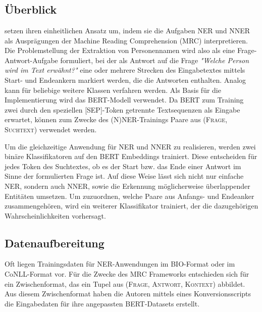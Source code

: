 

\chapter{}
\label{ch:MRC}


\section{Überblick}
\label{ch:MRC:sec:Überblick}

\textcite{li2019unified} setzen ihren einheitlichen Ansatz um, indem sie die Aufgaben NER und NNER als Ausprägungen der Machine Reading Comprehension (MRC) interpretieren. Die Problemstellung der Extraktion von Personennamen wird also als eine Frage-Antwort-Aufgabe formuliert, bei der als Antwort auf die Frage \emph{"Welche Person wird im Text erwähnt?"} eine oder mehrere Strecken des Eingabetextes mittels Start- und Endeankern markiert werden, die die Antworten enthalten. Analog kann für beliebige weitere Klassen verfahren werden. Als Basis für die Implementierung wird das BERT-Modell \parencite{devlin2019bert} verwendet. Da BERT zum Training zwei durch den speziellen [SEP]-Token getrennte Textsequenzen als Eingabe erwartet, können zum Zwecke des (N)NER-Trainings Paare aus \textsc{(Frage, Suchtext)} verwendet werden.

Um die gleichzeitige Anwendung für NER und NNER zu realisieren, werden zwei binäre Klassifikatoren auf den BERT Embeddings trainiert. Diese entscheiden für jedes Token des Suchtextes, ob es der Start bzw. das Ende einer Antwort im Sinne der formulierten Frage ist. Auf diese Weise lässt sich nicht nur einfache NER, sondern auch NNER, sowie die Erkennung möglicherweise überlappender Entitäten umsetzen. Um zuzuordnen, welche Paare aus Anfangs- und Endeanker zusammengehören, wird ein weiterer Klassifikator trainiert, der die dazugehörigen Wahrscheinlichkeiten vorhersagt.

\section{Datenaufbereitung}
\label{ch:MRC:sec:Datenaufbereitung}

Oft liegen Trainingsdaten für NER-Anwendungen im BIO-Format oder im CoNLL-Format vor. Für die Zwecke des MRC Frameworks entschieden sich  für ein Zwischenformat, das ein Tupel aus \textsc{(Frage, Antwort, Kontext)} abbildet. Aus diesem Zwischenformat haben die Autoren mittels eines Konversionsscripts die Eingabedaten für ihre angepassten BERT-Datasets erstellt.


